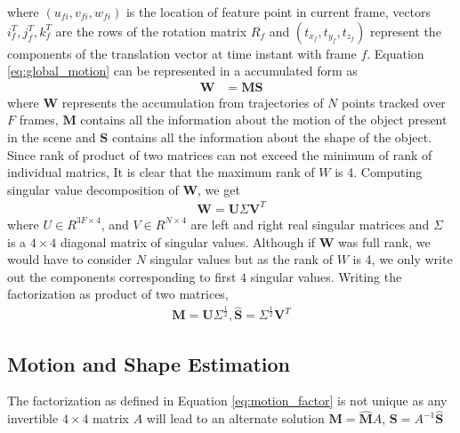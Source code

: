 \documentclass[conference]{IEEEtran}
\begin{document}
where $(u_{fi},v_{fi},w_{fi})$ is the location of feature point in current frame, vectors $i_f^T,j_f^T,k_f^T$ are the rows of the rotation matrix $R_f$ and $(t_{x_f},t_{y_f},t_{z_f})$ represent the components of the translation vector at time instant with frame $f$. Equation \ref{eq:global_motion} can be represented in a accumulated form as 
\begin{align}
\mathbf{W} & = \mathbf{M}\mathbf{S}
\end{align}
where $\mathbf{W}$ represents the accumulation from trajectories of $N$ points tracked over $F$ frames, $\mathbf{M}$ contains all the information about the motion of the object present in the scene and $\mathbf{S}$ contains all the information about the shape of the object. Since rank of product of two matrices can not exceed the minimum of rank of individual matrics, It is clear that the maximum rank of $W$ is 4. Computing singular value decomposition of $\mathbf{W}$, we get 
\begin{align}
\mathbf{W} = \mathbf{U}\Sigma\mathbf{V}^T \label{eq:motion_factor}
\end{align}
where $U \in R^{3F \times 4}$, and $V \in R^{N \times 4}$ are left and right real singular matrices and $\Sigma$ is a $4\times4$ diagonal matrix of singular values. Although if $\mathbf{W}$ was full rank, we would have to consider $N$ singular values but as the rank of $W$ is 4, we only write out the components corresponding to first $4$ singular values. Writing the factorization as product of two matrices,
\begin{align}
\mathbf{\hat{M}} = \mathbf{U}\Sigma^{\frac{1}{2}}, \mathbf{\hat{S}} = \Sigma^{\frac{1}{2}}\mathbf{V}^T \label{eq:motion_factor}
\end{align}

\subsection{Motion and Shape Estimation} The factorization as defined in Equation \ref{eq:motion_factor} is not unique as any invertible $4 \times 4$ matrix $A$  will lead to an alternate solution $\mathbf{M} = \mathbf{\hat{M}}A$,  $\mathbf{S} = A^{-1}\mathbf{\hat{S}}$
\end{document}
